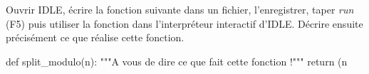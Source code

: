 Ouvrir IDLE, écrire la fonction suivante dans un fichier, l'enregistrer, taper \emph{run} (F5) puis utiliser la fonction dans l'interpréteur interactif d'IDLE. 
Décrire ensuite précisément ce que réalise cette fonction.

\begin{pyverbatim}
def split_modulo(n):
  """A vous de dire ce que fait cette fonction !"""
  return (n%
\end{pyverbatim}